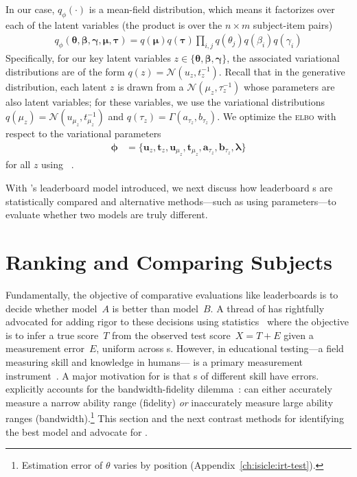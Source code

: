 In our case, $q_\phi(\cdot)$ is a mean-field distribution, which means it
factorizes over each of the latent variables (the product is over the
$n \times m$ subject-item pairs)
\begin{align*}
  q_\phi(\bm{\theta}, \bm{\beta}, \bm{\gamma}, \bm{\mu}, \bm{\tau}) = q(\bm{\mu})q(\bm{\tau})\prod_{i,j} q(\theta_j)q(\beta_i)q(\gamma_i)
\end{align*}
Specifically, for our key latent variables $z \in \{\bm{\theta}, \bm{\beta}, \bm{\gamma}\}$, the associated variational distributions are of the form $q(z) = \mathcal{N}(u_z, t_z^{-1})$.
Recall that in the generative distribution, each latent $z$ is drawn from a $\mathcal{N}(\mu_z, \tau_z^{-1})$ whose parameters are also latent variables; for these variables, we use the variational distributions $q(\mu_z) = \mathcal{N}(u_{\mu_z}, t_{\mu_z}^{-1})$ and $q(\tau_z) = \Gamma(a_{\tau_z}, b_{\tau_z})$. We optimize the \textsc{elbo} with respect to the variational parameters
\begin{align*}
  \bm{\phi} & =\{\bm{u}_z,\bm{t}_z,\bm{u}_{\mu_z},\bm{t}_{\mu_z},\bm{a}_{\tau_z},\bm{b}_{\tau_z},\bm{\lambda}\}
\end{align*}
for all $z$ using ~\citep{Kingma2014AdamAM}.

With \name{}'s leaderboard \irt{} model introduced, we next discuss
how leaderboard \subj{}s are statistically compared and alternative
methods---such as using \irt{} parameters---to evaluate whether two
models are truly different.
\section{Ranking and Comparing Subjects}
\label{ch:isicle:compare}


Fundamentally, the objective of comparative evaluations like
leaderboards is to decide whether model~$A$ is better than model~$B$.
A thread of \nlp{} has rightfully advocated for adding rigor to these
decisions using statistics~\citep[Classical Testing
  Theory]{traub1997ctt} where the objective is to infer a true
score~$T$ from the observed test score~$X=T+E$ given a measurement
error~$E$, uniform across \subj{}s.
However, in educational testing---a field measuring skill and
knowledge in humans---\irt{} is a primary measurement
instrument~\citep[p.~2]{hambleton1991fundamentals}.
A major motivation for \irt{} is that \subj{}s of different skill have
 errors.
\irt{} explicitly accounts for the bandwidth-fidelity
dilemma~\citep{mcbride1976bandwidth}: \itms{} can either accurately
measure a narrow ability range (fidelity) \textit{or} inaccurately
measure large ability ranges (bandwidth).\footnote{Estimation error
  of $\theta$ varies by position (Appendix~\ref{ch:isicle:irt-test}).  }
This section and the next contrast methods for identifying the best
model and advocate for \irt{}.

